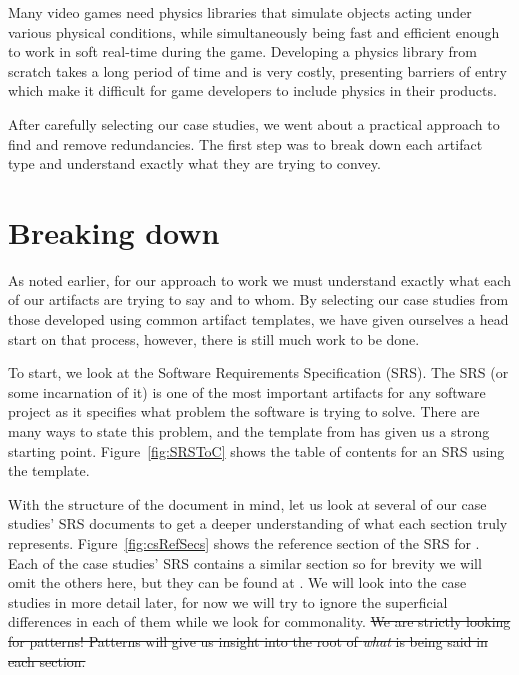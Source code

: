\card{\gp}
{Many video games need physics libraries that simulate 
 objects acting under various physical conditions, while simultaneously being 
 fast and efficient enough to work in soft real-time during the game. 
 Developing a physics library from scratch takes a long period of time and is 
 very costly, presenting barriers of entry which make it difficult for game 
 developers to include physics in their products.}
{}

After carefully selecting our case studies, we went about a practical approach
to find and remove redundancies. The first step was to break down each artifact
type and understand exactly what they are trying to convey.


\section{Breaking down \sfs}
\label{sec:breakdown}

As noted earlier, for our approach to work we must understand exactly what each
of our artifacts are trying to say and to whom. By selecting our case studies 
from those developed using common artifact templates, we have given ourselves a
head start on that process, however, there is still much work to be done.

To start, we look at the Software Requirements Specification (SRS). The SRS
(or some incarnation of it) is one of the most important artifacts for any
software project as it specifies what problem the software is trying to solve.
There are many ways to state this problem, and the template from \smithea{} has 
given us a strong starting point. Figure~\ref{fig:SRSToC} shows the table of 
contents for an SRS using the \smithea{} template.


With the structure of the document in mind, let us look at several of our case
studies' SRS documents to get a deeper understanding of what each section truly
represents. Figure~\ref{fig:csRefSecs} shows the reference section of the SRS 
for . Each of the case studies' SRS contains a similar section so for 
brevity we will omit the others here, but they can be found at . 
We will look into the case studies in more detail later, for now we will try to 
ignore the superficial differences in each of them while we look for 
commonality. \sout{We are strictly looking for patterns! Patterns will give 
us insight into the root of \emph{what} is being said in each section.}

